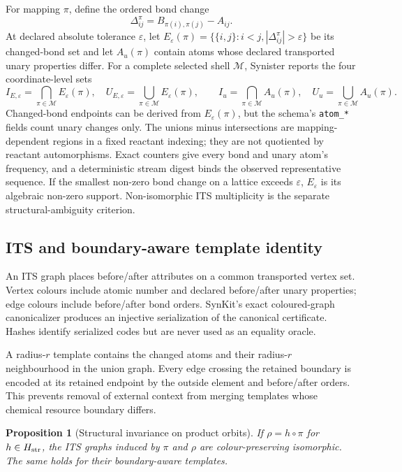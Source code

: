 \documentclass[11pt]{article}
\newtheorem{proposition}[theorem]{Proposition}
\theoremstyle{definition}
\begin{document}
For mapping \(\pi\), define the ordered bond change
\[
 \Delta^\pi_{ij}=B_{\pi(i),\pi(j)}-A_{ij}.
\]
At declared absolute tolerance \(\varepsilon\), let
\(E_\varepsilon(\pi)=\{\{i,j\}:i<j,|\Delta^\pi_{ij}|>\varepsilon\}\) be its
changed-bond set and let \(A_u(\pi)\) contain atoms whose declared transported
unary properties differ.  For a complete selected shell \(\mathcal M\),
Synister reports the four coordinate-level sets
\[
 I_{E,\varepsilon}=\bigcap_{\pi\in\mathcal M}E_\varepsilon(\pi),\quad
 U_{E,\varepsilon}=\bigcup_{\pi\in\mathcal M}E_\varepsilon(\pi),\qquad
 I_u=\bigcap_{\pi\in\mathcal M}A_u(\pi),\quad
 U_u=\bigcup_{\pi\in\mathcal M}A_u(\pi).
\]
Changed-bond endpoints can be derived from \(E_\varepsilon(\pi)\), but the schema's
\texttt{atom\_*} fields count unary changes only.  The unions minus
intersections are mapping-dependent regions in a fixed reactant indexing;
they are not quotiented by reactant automorphisms.  Exact counters give every
bond and unary atom's frequency, and a deterministic stream digest binds the
observed representative sequence.  If the smallest non-zero bond change on a
lattice exceeds \(\varepsilon\), \(E_\varepsilon\) is its algebraic non-zero
support.  Non-isomorphic ITS multiplicity is the separate
structural-ambiguity criterion.

\subsection{ITS and boundary-aware template identity}

An ITS graph places before/after attributes on a common transported vertex
set.  Vertex colours include atomic number and declared before/after unary
properties; edge colours include before/after bond orders.  SynKit's exact
coloured-graph canonicalizer produces an injective serialization of the
canonical certificate.  Hashes identify serialized codes but are never used
as an equality oracle.

A radius-\(r\) template contains the changed atoms and their radius-\(r\)
neighbourhood in the union graph.  Every edge crossing the retained boundary
is encoded at its retained endpoint by the outside element and before/after
orders.  This prevents removal of external context from merging templates
whose chemical resource boundary differs.

\begin{proposition}[Structural invariance on product orbits]
If \(\rho=h\circ\pi\) for \(h\in H_{\rm str}\), the ITS graphs induced by
\(\pi\) and \(\rho\) are colour-preserving isomorphic.  The same holds for
their boundary-aware templates.
\end{proposition}
\end{document}
